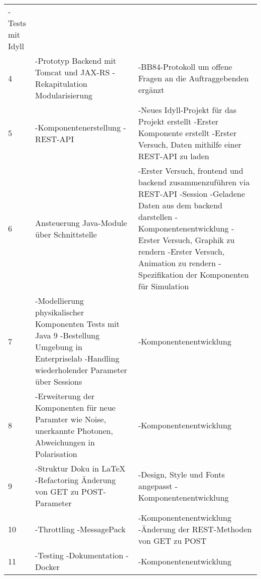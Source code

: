 \begin{longtable}{p{1cm}p{6cm}p{6cm}}
-Tests mit Idyll \\
4 & -Prototyp Backend mit Tomcat und JAX-RS \newline -Rekapitulation Modularisierung  & -BB84-Protokoll um offene Fragen an die Auftraggebenden ergänzt \\
5 & -Komponentenerstellung \newline -REST-API & -Neues Idyll-Projekt für das Projekt erstellt \newline  -Erster Komponente erstellt \newline -Erster Versuch, Daten mithilfe einer REST-API zu laden \\
6 & Ansteuerung Java-Module über Schnittstelle & -Erster Versuch, frontend und backend zusammenzuführen via REST-API \newline -Session \newline -Geladene Daten aus dem backend darstellen \newline -Komponentenentwicklung \newline -Erster Versuch, Graphik zu rendern \newline -Erster Versuch, Animation zu rendern \newline -Spezifikation der Komponenten für Simulation \\
7 & -Modellierung physikalischer Komponenten \newline Tests mit Java 9  \newline -Bestellung Umgebung in Enterpriselab \newline -Handling wiederholender Parameter über Sessions  & -Komponentenentwicklung \\
8 & -Erweiterung der Komponenten für neue Paramter wie Noise, unerkannte Photonen, Abweichungen in Polarisation & -Komponentenentwicklung \\
9   & -Struktur Doku in LaTeX \newline -Refactoring \newline Änderung von GET zu POST-Parameter & -Design, Style und Fonts angepasst \newline -Komponentenentwicklung \\
10 & -Throttling \newline -MessagePack & -Komponentenentwicklung \newline -Änderung der REST-Methoden von GET zu POST \\
11 & -Testing \newline -Dokumentation \newline -Docker & -Komponentenentwicklung \\

\end{longtable}
